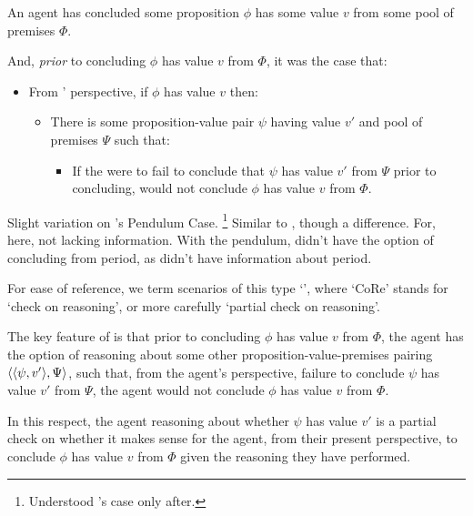 \begin{note}
  \begin{scenarioType}
    \label{scenType:CoR}
    An agent \vAgent{} has concluded some proposition \(\phi\) has some value \(v\) from some pool of premises \(\Phi\).

    And, \emph{prior} to concluding \(\phi\) has value \(v\) from \(\Phi\), it was the case that:
    \begin{itemize}
    \item
      From \vAgent{}' perspective, if \(\phi\) has value \(v\) then:
      \begin{itemize}
      \item
        There is some proposition-value pair \(\psi\) having value \(v'\) and pool of premises \(\Psi\) such that:
        \begin{itemize}
        \item
          If the \vAgent{} were to fail to conclude that \(\psi\) has value \(v'\) from \(\Psi\) prior to concluding, \vAgent{} would not conclude \(\phi\) has value \(v\) from \(\Phi\).
        \end{itemize}
      \end{itemize}
    \end{itemize}
    \vspace{-\baselineskip}
  \end{scenarioType}

  {
    \color{red}
    Slight variation on \citeauthor{Tolliver:1982us}'s Pendulum Case.%
    \footnote{
      Understood \citeauthor{Tolliver:1982us}'s case only after.
    }
    Similar to \citeauthor{Tolliver:1982us}, though a difference.
  For, here, not lacking information.
  With the pendulum, didn't have the option of concluding from period, as didn't have information about period.
  }

  For ease of reference, we term scenarios of this type `', where `CoRe' stands for `check on reasoning', or more carefully `partial check on reasoning'.

  The key feature of  is that prior to concluding \(\phi\) has value \(v\) from \(\Phi\), the agent has the option of reasoning about some other proposition-value-premises pairing \(\langle \langle \psi, v' \rangle, \Psi \rangle\), such that, from the agent's perspective, failure to conclude \(\psi\) has value \(v'\) from \(\Psi\), the agent would not conclude \(\phi\) has value \(v\) from \(\Phi\).

  In this respect, the agent reasoning about whether \(\psi\) has value \(v'\) is a partial check on whether it makes sense for the agent, from their present perspective, to conclude \(\phi\) has value \(v\) from \(\Phi\) given the reasoning they have performed.


\end{note}
